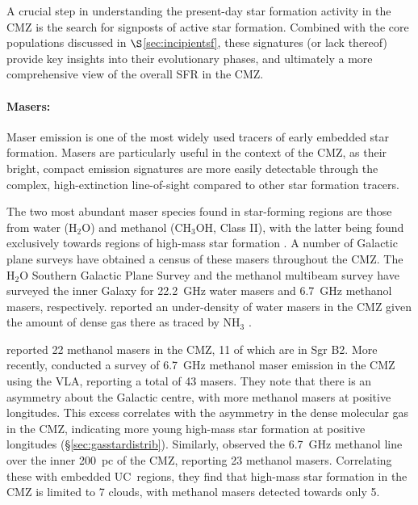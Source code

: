 

A crucial step in understanding the present-day star formation activity in the CMZ is the search for signposts of active star formation. Combined with the core populations discussed in $\S$\ref{sec:incipientsf}, these signatures (or lack thereof) provide key insights into their evolutionary phases, and ultimately a more comprehensive view of the overall SFR in the CMZ.

\paragraph{Masers:}\label{sec:masers} Maser emission is one of the most widely used tracers of early embedded star formation. Masers are particularly useful in the context of the CMZ, as their bright, compact emission signatures are more easily detectable through the complex, high-extinction line-of-sight compared to other star formation tracers. 

The two most abundant maser species found in star-forming regions are those from water (H$_{2}$O) and methanol (CH$_{3}$OH, Class II), with the latter being found exclusively towards regions of high-mass star formation \citep[e.g.][]{Ellingsen2006}. A number of Galactic plane surveys have obtained a census of these masers throughout the CMZ. The H$_{2}$O Southern Galactic Plane Survey \citep[HOPS,][]{Walsh2011} and the methanol multibeam survey \citep[MMB,][]{Green2009, Caswell2010} have surveyed the inner Galaxy for 22.2~GHz water masers and 6.7~GHz methanol masers, respectively. \citet{Walsh2011} reported an under-density of water masers in the CMZ given the amount of dense gas there as traced by NH$_{3}$ \citep{Longmore2013b}. 

\citet{Caswell2010} reported 22 methanol masers in the CMZ, 11 of which are in Sgr B2. More recently, \citet{Rickert2019} conducted a survey of 6.7~GHz methanol maser emission in the CMZ using the VLA, reporting a total of 43 masers. They note that there is an asymmetry about the Galactic centre, with more methanol masers at positive longitudes. This excess correlates with the asymmetry in the dense molecular gas in the CMZ, indicating more young high-mass star formation at positive longitudes (\S\ref{sec:gasstardistrib}). Similarly, \citet{Lu2019a} observed the 6.7~GHz methanol line over the inner 200~pc of the CMZ, reporting 23 methanol masers. Correlating these with embedded UC\hii\ regions, they find that high-mass star formation in the CMZ is limited to 7 clouds, with methanol masers detected towards only 5.
    
